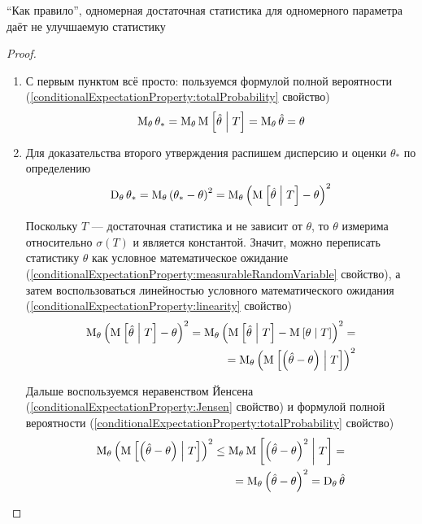 \begin{remark}
  ``Как правило'', одномерная достаточная статистика
  для одномерного параметра даёт не улучшаемую статистику
\end{remark}

\begin{proof}
  \begin{enumerate}
      \item С первым пунктом всё просто:
      пользуемся формулой полной вероятности
      (\ref{conditionalExpectationProperty:totalProbability} свойство)
      $$\operatorname{M}_{\theta} \theta_*
      = \operatorname{M}_{\theta} \operatorname{M}_{} \left[ \hat{\theta} \;\middle|\; T \right]
      = \operatorname{M}_{\theta} \hat{\theta}
      = \theta$$
      \item Для доказательства второго утверждения распишем дисперсию и оценки
        $\theta_*$ по определению
      $$\operatorname{D}_{\theta} \theta_*
      = \operatorname{M}_{\theta} \left( \theta_* - \theta \right)^2
      = \operatorname{M}_{\theta} \left( \operatorname{M}_{} \left[ \hat{\theta} \;\middle|\; T \right]
    - \theta \right)^2$$

      Поскольку $T$ --- достаточная статистика и не зависит от $\theta$,
      то $\theta$ измерима относительно $\sigma\left( T \right)$
      и является константой. Значит, можно переписать
      статистику $\theta$ как условное математическое ожидание
      (\ref{conditionalExpectationProperty:measurableRandomVariable}
      свойство), а затем воспользоваться линейностью
      условного математического ожидания
      (\ref{conditionalExpectationProperty:linearity} свойство)
      \begin{align*}
      \operatorname{M}_{\theta} \left( \operatorname{M}_{} \left[ \hat{\theta} \;\middle|\; T \right]
        - \theta \right)^2
    = \operatorname{M}_{\theta} \left( \operatorname{M}_{} \left[ \hat{\theta} \;\middle|\; T \right]
        - \operatorname{M}_{} \left[ \theta \;\middle|\; T \right] \right)^2 = \\
    = \operatorname{M}_{\theta} \left(
        \operatorname{M}_{} \left[ \left( \hat{\theta} - \theta \right) \;\middle|\; T \right]
        \right)^2
      \end{align*}

      Дальше воспользуемся неравенством Йенсена
      (\ref{conditionalExpectationProperty:Jensen} свойство)
      и формулой полной вероятности
      (\ref{conditionalExpectationProperty:totalProbability} свойство)
      \begin{align*}
      \operatorname{M}_{\theta} \left( \operatorname{M}_{} \left[ \left( \hat{\theta}
        - \theta \right) \;\middle|\; T \right]\right)^2
    \le \operatorname{M}_{\theta} \operatorname{M}_{} \left[ \left( \hat{\theta}
        - \theta \right)^2 \;\middle|\; T \right] = \\
    = \operatorname{M}_{\theta} \left( \hat{\theta} -\theta \right)^2
    = \operatorname{D}_{\theta} \hat{\theta}
      \end{align*}
  \end{enumerate}
\end{proof}

